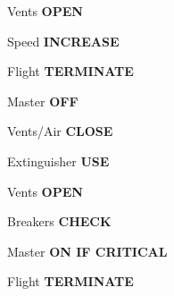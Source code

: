 \documentclass{article}
\begin{document}
\begin{multicols*}{3}
Vents \dotfill \textbf{OPEN}

Speed \dotfill \textbf{INCREASE}

Flight \dotfill \textbf{TERMINATE}

\colorbox{red!80}{}

Master \dotfill \textbf{OFF}

Vents/Air \dotfill \textbf{CLOSE}

Extinguisher \dotfill \textbf{USE}

Vents \dotfill \textbf{OPEN}

Breakers \dotfill \textbf{CHECK}

Master \dotfill \textbf{ON IF CRITICAL}

Flight \dotfill \textbf{TERMINATE}



\end{multicols*}
\end{document}
